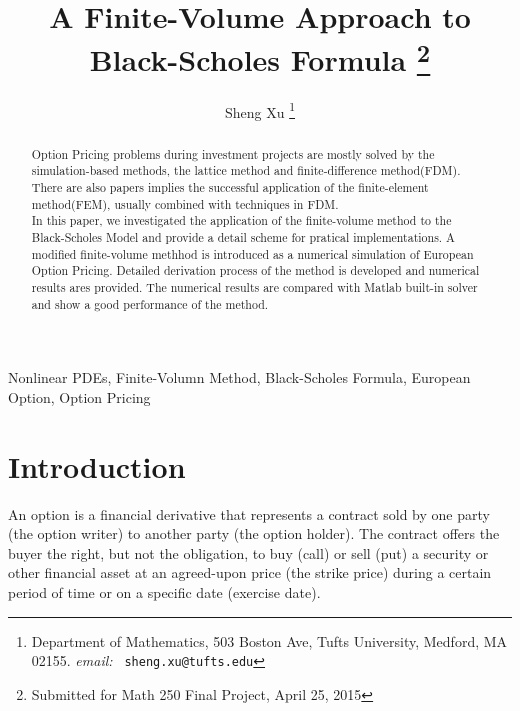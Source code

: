 \documentclass[final]{siamltex}
\title{A Finite-Volume Approach to Black-Scholes Formula \thanks{Submitted for Math 250 Final Project, April 25, 2015}}
\author{Sheng Xu
\thanks{Department of Mathematics, 503 Boston Ave, Tufts University,
Medford, MA 02155. {\it email:} {\tt
sheng.xu@tufts.edu}  } }
\begin{document}
\maketitle



\begin{keywords}
Nonlinear PDEs, Finite-Volumn Method, Black-Scholes Formula, European Option, Option Pricing
\end{keywords}

\pagestyle{myheadings}
\thispagestyle{plain}


\begin{abstract}
	Option Pricing problems during investment projects are mostly solved by the simulation-based methods, the lattice method and finite-difference method(FDM). There are also papers implies the successful application of the finite-element method(FEM), usually combined with techniques in FDM.\\
	In this paper, we investigated the application of the finite-volume method to the Black-Scholes Model and provide a detail scheme for pratical implementations. A modified finite-volume methhod is introduced as a numerical simulation of European Option Pricing. Detailed derivation process of the method is developed and numerical results ares provided. The numerical results are compared with Matlab built-in solver and show a good performance of the method. 
	
\end{abstract}

\section{Introduction} 
An option is a financial derivative that represents a contract sold by one party (the option writer) to another party (the option holder). The contract offers the buyer the right, but not the obligation, to buy (call) or sell (put) a security or other financial asset at an agreed-upon price (the strike price) during a certain period of time or on a specific date (exercise date)\cite{JohnHull}.\\
\end{document}
